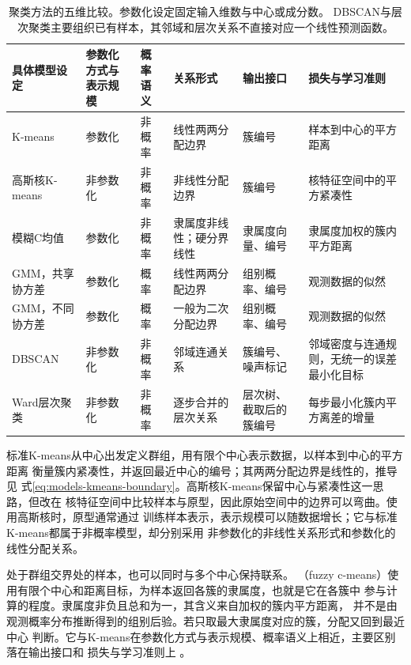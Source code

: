 \begin{table}[htbp]
  \centering
  \footnotesize
  \setlength{\tabcolsep}{4pt}
  \renewcommand{\arraystretch}{1.25}
  \begin{tabularx}{\linewidth}{@{}>{\raggedright\arraybackslash}p{28mm}>{\raggedright\arraybackslash}p{16mm}>{\raggedright\arraybackslash}p{11mm}>{\raggedright\arraybackslash}p{23mm}>{\raggedright\arraybackslash}p{22mm}>{\raggedright\arraybackslash}X@{}}
    \toprule
    \textbf{具体模型设定} & \textbf{参数化方式与表示规模} & \textbf{概率语义} & \textbf{关系形式} & \textbf{输出接口} & \textbf{损失与学习准则} \\
    \midrule
    K-means & 参数化 & 非概率 & 线性两两分配边界 & 簇编号 & 样本到中心的平方距离 \\
    高斯核K-means & 非参数化 & 非概率 & 非线性分配边界 & 簇编号 & 核特征空间中的平方紧凑性 \\
    模糊C均值 & 参数化 & 非概率 & 隶属度非线性；硬分界线性 & 隶属度向量、编号 & 隶属度加权的簇内平方距离 \\
    GMM，共享协方差 & 参数化 & 概率 & 线性两两分配边界 & 组别概率、编号 & 观测数据的似然 \\
    GMM，不同协方差 & 参数化 & 概率 & 一般为二次分配边界 & 组别概率、编号 & 观测数据的似然 \\
    DBSCAN & 非参数化 & 非概率 & 邻域连通关系 & 簇编号、噪声标记 & 邻域密度与连通规则，无统一的误差最小化目标 \\
    Ward层次聚类 & 非参数化 & 非概率 & 逐步合并的层次关系 & 层次树、截取后的簇编号 & 每步最小化簇内平方离差的增量 \\
    \bottomrule
  \end{tabularx}
  \caption{聚类方法的五维比较。参数化设定固定输入维数与中心或成分数。
  DBSCAN与层次聚类主要组织已有样本，其邻域和层次关系不直接对应一个线性预测函数。}
  \label{tab:models-clusterers}
\end{table}
\FloatBarrier

标准K-means从中心出发定义群组，用有限个中心表示数据，以样本到中心的平方距离
衡量簇内紧凑性，并返回最近中心的编号；其两两分配边界是线性的，推导见
式\eqref{eq:models-kmeans-boundary}。高斯核K-means保留中心与紧凑性这一思路，但改在
核特征空间中比较样本与原型，因此原始空间中的边界可以弯曲。使用高斯核时，原型通常通过
训练样本表示，表示规模可以随数据增长；它与标准K-means都属于非概率模型，却分别采用
非参数化的非线性关系形式和参数化的线性分配关系。

处于群组交界处的样本，也可以同时与多个中心保持联系。
（fuzzy c-means）使用有限个中心和距离目标，为样本返回各簇的隶属度，也就是它在各簇中
参与计算的程度。隶属度非负且总和为一，其含义来自加权的簇内平方距离，
并不是由观测概率分布推断得到的组别后验。若只取最大隶属度对应的簇，分配又回到最近中心
判断。它与K-means在参数化方式与表示规模、概率语义上相近，主要区别落在输出接口和
损失与学习准则上
。

